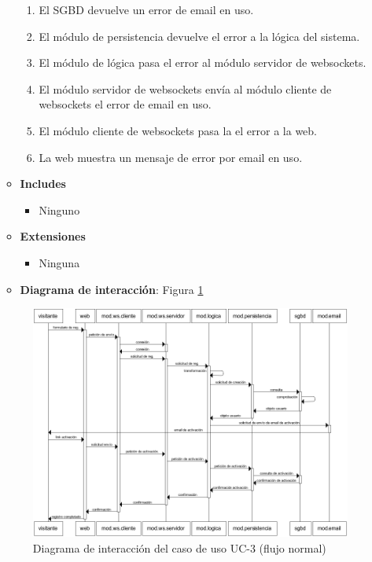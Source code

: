 \begin{enumerate}
\begin{itemize}
\begin{enumerate}
    \item El SGBD devuelve un error de email en uso.
    \item El módulo de persistencia devuelve el error a la lógica del sistema.
    \item El módulo de lógica pasa el error al módulo servidor de websockets.
    \item El módulo servidor de websockets envía al módulo cliente de websockets el error de email en uso.
    \item El módulo cliente de websockets pasa la el error a la web.
    \item La web muestra un mensaje de error por email en uso.
    \end{enumerate}
  \item \textbf{Includes}
    \begin{itemize}
    \item Ninguno
    \end{itemize}
  \item \textbf{Extensiones}
    \begin{itemize}
    \item Ninguna
    \end{itemize}
  \item \textbf{Diagrama de interacción}: Figura \ref{fig::uc-3}
  \end{itemize}


  \begin{figure}[h]
    \begin{center}
      \includegraphics[width=\textwidth]{images/uc-3.png}
      \caption{Diagrama de interacción del caso de uso UC-3 (flujo normal)}
      \label{fig::uc-3}
    \end{center}
  \end{figure}


\end{enumerate}
